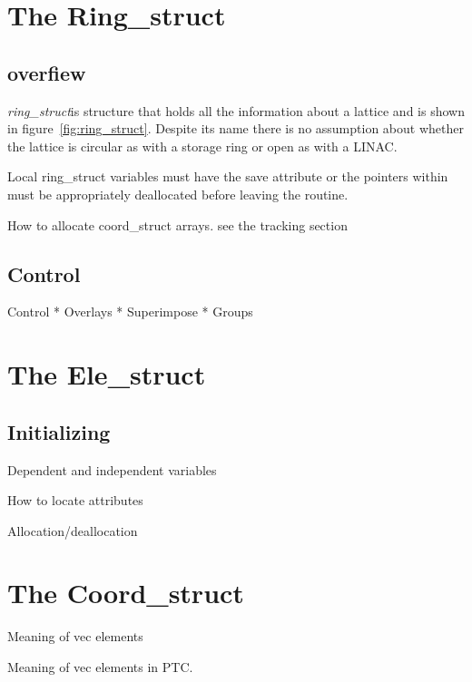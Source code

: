 \documentclass{book}
\newcommand{\rs}{{\it ring\_struct}}
\begin{document}
\chapter{The Ring\_struct}

\section{overfiew}

\rs is structure that holds all the information about a lattice
and is shown in figure~\ref{fig:ring_struct}. Despite its name there
is no assumption about whether the lattice is circular as with a
storage ring or open as with a LINAC.




Local ring\_struct variables must have the save attribute or
the pointers within must be appropriately deallocated
before leaving the routine.

How to allocate coord\_struct arrays. see the tracking section

\section{Control}
  Control
    * Overlays
    * Superimpose
    * Groups

\chapter{The Ele\_struct}


\section{Initializing}

  Dependent and independent variables

  How to locate attributes

  Allocation/deallocation

\chapter{The Coord\_struct}

  Meaning of vec elements

  Meaning of vec elements in PTC.

\end{document}
